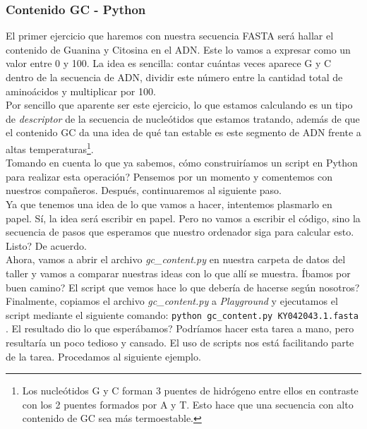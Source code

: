 \documentclass[10pt,letterpaper]{article}
\newcommand{\inlinecode}[1]{
\colorbox{light-gray}{\texttt{#1}}
}
\begin{document}
\subsubsection{Contenido GC - Python}
El primer ejercicio que haremos con nuestra secuencia FASTA ser\'a hallar el contenido de Guanina y Citosina en el ADN. Este lo vamos a expresar como un valor entre 0 y 100. La idea es sencilla: contar cu\'antas veces aparece G y C dentro de la secuencia de ADN, dividir este n\'umero entre la cantidad total de amino\'acidos y multiplicar por 100.\\

Por sencillo que aparente ser este ejercicio, lo que estamos calculando es un tipo de \textit{descriptor} de la secuencia de nucle\'otidos que estamos tratando, adem\'as de que el contenido GC da una idea de qu\'e tan estable es este segmento de ADN frente a altas temperaturas\footnote{Los nucle\'otidos G y C forman 3 puentes de hidr\'ogeno entre ellos en contraste con los 2 puentes formados por A y T. Esto hace que una secuencia con alto contenido de GC sea m\'as termoestable.}.\\

Tomando en cuenta lo que ya sabemos, c\'omo construir\'iamos un script en Python para realizar esta operaci\'on? Pensemos por un momento y comentemos con nuestros compa\~neros. Despu\'es, continuaremos al siguiente paso.\\

Ya que tenemos una idea de lo que vamos a hacer, intentemos plasmarlo en papel. S\'i, la idea ser\'a escribir en papel. Pero no vamos a escribir el c\'odigo, sino la secuencia de pasos que esperamos que nuestro ordenador siga para calcular esto. Listo? De acuerdo.\\

Ahora, vamos a abrir el archivo \textit{gc\_content.py} en nuestra carpeta de datos del taller y vamos a comparar nuestras ideas con lo que all\'i se muestra. \'Ibamos por buen camino? El script que vemos hace lo que deber\'ia de hacerse seg\'un nosotros?\\

Finalmente, copiamos el archivo \textit{gc\_content.py} a \textit{Playground} y ejecutamos el script mediante el siguiente comando: \inlinecode{python gc\_content.py KY042043.1.fasta}. El resultado dio lo que esper\'abamos? Podr\'iamos hacer esta tarea a mano, pero resultar\'ia un poco tedioso y cansado. El uso de scripts nos est\'a facilitando parte de la tarea. Procedamos al siguiente ejemplo.
\end{document}
